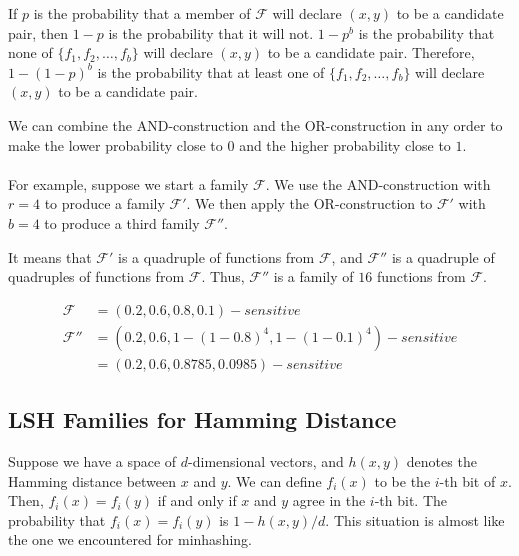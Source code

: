 If $p$ is the probability that a member of $\boldsymbol{\mathcal{F}}$ will declare $(x, y)$ to be a candidate pair, then $1 - p$ is the probability that it will not. $1 - p^b$ is the probability that none of $\{f_1, f_2, \dots, f_b\}$ will declare $(x, y)$ to be a candidate pair. Therefore, $1 - (1 - p)^b$ is the probability that at least one of $\{f_1, f_2, \dots, f_b\}$ will declare $(x, y)$ to be a candidate pair.

We can combine the AND-construction and the OR-construction in any order to make the lower probability close to $0$ and the higher probability close to $1$.
\\
\\
For example, suppose we start a family $\boldsymbol{\mathcal{F}}$. We use the AND-construction with $r = 4$ to produce a family $\boldsymbol{\mathcal{F'}}$. We then apply the OR-construction to $\boldsymbol{\mathcal{F'}}$ with $b = 4$ to produce a third family $\boldsymbol{\mathcal{F''}}$. 

It means that $\boldsymbol{\mathcal{F'}}$ is a quadruple of functions from $\boldsymbol{\mathcal{F}}$, and $\boldsymbol{\mathcal{F''}}$ is a quadruple of quadruples of functions from $\boldsymbol{\mathcal{F}}$. Thus, $\boldsymbol{\mathcal{F''}}$ is a family of $16$ functions from $\boldsymbol{\mathcal{F}}$.

\begin{equation*}
    \begin{split}
        \boldsymbol{\mathcal{F}}   & = (0.2, 0.6, 0.8, 0.1)-sensitive \\
        \boldsymbol{\mathcal{F''}} & = (0.2, 0.6, 1 - (1 - 0.8)^4, 1 - (1 - 0.1)^4)-sensitive \\
                                   & = (0.2, 0.6, 0.8785, 0.0985)-sensitive 
    \end{split}
\end{equation*}

\subsection{LSH Families for Hamming Distance}\label{subsec:lsh-families-for-hamming-distance}

Suppose we have a space of $d$-dimensional vectors, and $h(x, y)$ denotes the Hamming distance between $x$ and $y$. We can define $f_i(x)$ to be the $i$-th bit of $x$. Then, $f_i(x) = f_i(y)$ if and only if $x$ and $y$ agree in the $i$-th bit. The probability that $f_i(x) = f_i(y)$ is $1 - h(x, y) / d$. This situation is almost like the one we encountered for minhashing.

